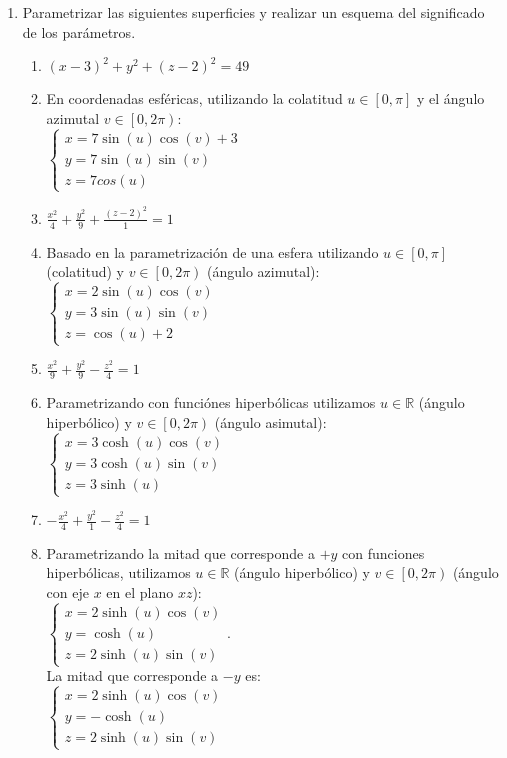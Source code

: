 \documentclass[a4paper]{article}
\newcommand{\answer}{\item[**]}
\newcommand{\exercise}{\item}
\newcommand{\SEL}[1]{ \left\{\begin{matrix} #1 \end{matrix}\right. }
\newcommand{\df}[2]{\displaystyle\frac{#1}{#2}}
\begin{document}
\begin{enumerate}
\begin{multicols}{2}
\begin{enumerate} [label=(\alph*)]
		\item Una elipsoide cuya intersección con el plano $xz$ es una elipse de eje focal $z$, con semidiametro menor $3$ y semidiametro mayor $4$

		\item Una superficie cilindrica cuya intersección con el plano $yz$ es una hipérbola con diámetros transverso y conjugado iguales 
		\answer El plano $yz$ tiene ecuación $x=0$ por lo que la intersección es $12y^2+s.z^2=144$. Para que sea una hiperbola con diámetros transverso y conjugado iguales $s=12$. Para que sea una superficie cilíndrica $r=0$.

	\end{enumerate}
	\end{multicols}

	\exercise Parametrizar las siguientes superficies y realizar un esquema del significado de los parámetros.
	\begin{multicols}{2}
	\begin{enumerate} [label=(\alph*)]

		\item $(x-3)^2+y^2+(z-2)^2=49$
		\answer En coordenadas esféricas, utilizando la colatitud $u \in \left[0,\pi\right]$ y el ángulo azimutal $v \in \left[0,2\pi\right)$: \\ $\SEL{x=7\sin(u)\cos(v)+3 \\ y=7\sin(u)\sin(v) \\ z=7 cos(u)}$

		\item $\df{x^2}{4}+\df{y^2}{9}+\df{(z-2)^2}{1}=1$
		\answer Basado en la parametrización de una esfera utilizando $u \in \left[0,\pi\right]$ (colatitud) y $v \in \left[0,2\pi\right)$ (ángulo azimutal): \\ $\SEL{x=2\sin(u)\cos(v) \\ y=3\sin(u)\sin(v) \\ z= \cos(u)+2}$

		\item $\df{x^2}{9}+\df{y^2}{9}-\df{z^2}{4}=1$
		\answer Parametrizando con funciónes hiperbólicas utilizamos $u \in \mathbb{R}$ (ángulo hiperbólico) y $v \in \left[0,2\pi\right)$ (ángulo asimutal): \\ $\SEL{x=3\cosh(u)\cos(v) \\ y=3\cosh(u)\sin(v) \\ z=3\sinh(u)}$

		\item $-\df{x^2}{4}+\df{y^2}{1}-\df{z^2}{4}=1$
		\answer Parametrizando la mitad que corresponde a $+y$ con funciones hiperbólicas, utilizamos $u \in \mathbb{R}$ (ángulo hiperbólico) y $v \in \left[0,2\pi\right)$ (ángulo con eje $x$ en el plano $xz$): \\ $\SEL{x=2\sinh(u)\cos(v) \\ y=\cosh(u) \\ z=2\sinh(u)\sin(v)}$. \\ La mitad que corresponde a $-y$ es: \\ $\SEL{x=2\sinh(u)\cos(v) \\ y=-\cosh(u) \\ z=2\sinh(u)\sin(v)}$


\end{enumerate}
\end{multicols}
\end{enumerate}
\end{document}
